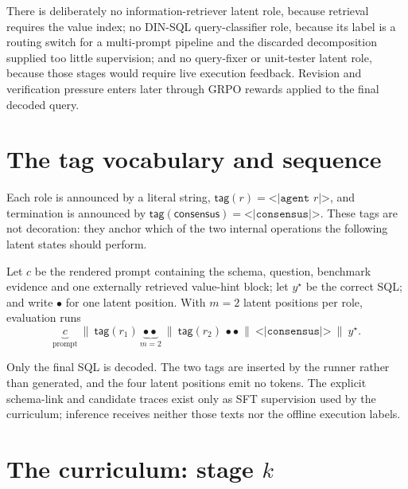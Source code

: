 \documentclass[11pt]{article}
\theoremstyle{definition}
\begin{document}
There is deliberately no information-retriever latent role, because retrieval requires the value index; no DIN-SQL query-classifier role, because its label is a routing switch for a multi-prompt pipeline and the discarded decomposition supplied too little supervision; and no query-fixer or unit-tester latent role, because those stages would require live execution feedback. Revision and verification pressure enters later through GRPO rewards applied to the final decoded query.

\begin{center}
\end{center}

\section{The tag vocabulary and sequence}

Each role is announced by a literal string, $\textsf{tag}(r)=\texttt{<|agent }r\texttt{|>}$, and termination is announced by $\textsf{tag}(\textsf{consensus})=\texttt{<|consensus|>}$. These tags are not decoration: they anchor which of the two internal operations the following latent states should perform.

Let $c$ be the rendered prompt containing the schema, question, benchmark evidence and one externally retrieved value-hint block; let $y^\star$ be the correct SQL; and write $\bullet$ for one latent position. With $m=2$ latent positions per role, evaluation runs
\[
\underbrace{c}_{\text{prompt}}\ \big\|\ \textsf{tag}(r_1)\,\underbrace{\bullet\bullet}_{m=2}\ \big\|\ \textsf{tag}(r_2)\,\bullet\bullet\ \big\|\ \texttt{<|consensus|>}\ \big\|\ y^\star .
\tag{5.1}
\]

Only the final SQL is decoded. The two tags are inserted by the runner rather than generated, and the four latent positions emit no tokens. The explicit schema-link and candidate traces exist only as SFT supervision used by the curriculum; inference receives neither those texts nor the offline execution labels.

\section{The curriculum: stage $k$}
\label{sec:curriculum}
\end{document}
